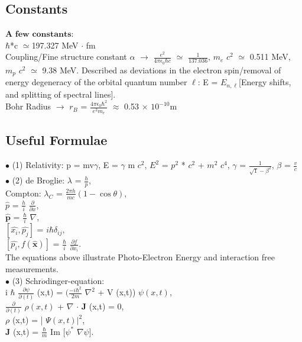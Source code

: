 \documentclass[a4paper, 10pt, onepage]{elegantbook}
\begin{document}
{\subsection{Constants}
$\mathbf{\textbf{A few constants:}}$  \\

$\hbar$*c $\simeq$197.327 MeV $ \cdot$ fm  \\

Coupling/Fine structure constant $\alpha$ $\rightarrow$ $\frac{e^2}{4 \pi \epsilon_0 \hbar c}$ $\simeq$ $\frac{1}{137.036}$, $m_e$ $c^2$ $\simeq$ 0.511 MeV, $m_p$ $c^2$ $\simeq$ 9.38 MeV. 
Described as deviations in the electron spin/removal of energy degeneracy of the orbital quantum number $\ell$:  
E = $E_{n,\ell}$[Energy shifts, and splitting of spectral lines]. \\

Bohr Radius $\longrightarrow$ $r_B$ = $\frac{4 \pi \epsilon_0 \hbar^2}{e^2{m_e}}$ $\approx$ 0.53 $\times$ $10^{-10}$m  

\subsection{Useful Formulae}

$\bullet$  (1) Relativity: p = mv$\gamma$, E = $\gamma$ m $c^2$, $E^2$ = $p^2$ * $c^2$ + $m^2$ $c^4$, $\gamma$ = $\frac{1}{\sqrt1 - \beta^2}$,
$\beta$ = $\frac{v}{c}$  \\

$\bullet$ (2) de Broglie: $\lambda$ = $\frac{h}{p}$,  \\
Compton: $\lambda_C$ = $\frac{2 \pi h}{mc}(1 - \cos \theta)$,  \\

\noindent
$\hat{p}$ = $\frac{h}{i}$ $\frac{\partial}{\partial x}$,  \\
$\hat{\mathbf p}$ = $\frac{\hbar}{i}$ $\nabla$,  \\
$[\hat{x_i},\hat{p_j}]$ = $i\hbar \delta_{ij}$,  \\
$[\hat{p_i},f(\hat{\mathbf x})]$ = $\frac{\hbar}{i}$ $\frac{\partial{f}} {\partial{x_i}}$.  \\

The equations above illustrate Photo-Electron Energy and interaction free measurements.  \\

$\bullet$ (3) Schr$\ddot{o}$dinger-equation:  \\
i $\hbar$ $\frac{\partial \psi}{\partial(t)}$ (x,t) =  $(\frac{- i \hbar^2}{2 m}$ $\nabla^2$ + V (x,t)) $\psi (x,t)$,  \\
$\frac{\partial}{\partial(t)}$ $\rho (x,t)$ + $\nabla$ $\cdot$ $\mathbf J$ (x,t) = 0,   \\
$\rho$ (x,t) = | $\Psi (x,t) |^2$,  \\
$\mathbf J$ (x,t) = $\frac{\hbar} {m}$ Im $[\psi^*$ $\nabla \psi]$. \\

}
\end{document}
